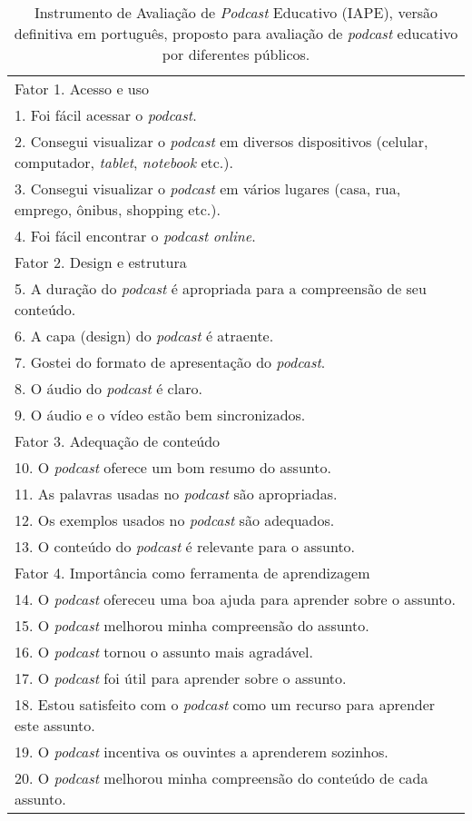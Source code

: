 \begin{table}[htb]
\small
\centering
\caption{Instrumento de Avaliação de \textit{Podcast} Educativo (IAPE), versão definitiva em português, proposto para avaliação de \textit{podcast} educativo por diferentes públicos.}
\label{tab-04}
\begin{threeparttable}
\begin{tabular}{p{}}
\toprule
Fator 1. Acesso e uso \\
1. Foi fácil acessar o \textit{podcast}.\\
2. Consegui visualizar o \textit{podcast} em diversos dispositivos (celular, computador, \textit{tablet}, \textit{notebook} etc.). \\
3. Consegui visualizar o \textit{podcast} em vários lugares (casa, rua, emprego, ônibus, shopping etc.).\\
4. Foi fácil encontrar o \textit{podcast} \textit{online}. \\

Fator 2. Design e estrutura\\
5. A duração do \textit{podcast} é apropriada para a compreensão de seu conteúdo. \\
6. A capa (design) do \textit{podcast} é atraente. \\
7. Gostei do formato de apresentação do \textit{podcast}.\\
8. O áudio do \textit{podcast} é claro. \\
9. O áudio e o vídeo estão bem sincronizados. \\

Fator 3. Adequação de conteúdo\\
10. O \textit{podcast} oferece um bom resumo do assunto.\\
11. As palavras usadas no \textit{podcast} são apropriadas.\\
12. Os exemplos usados no \textit{podcast} são adequados. \\
13. O conteúdo do \textit{podcast} é relevante para o assunto. \\

Fator 4. Importância como ferramenta de aprendizagem\\
14. O \textit{podcast} ofereceu uma boa ajuda para aprender sobre o assunto. \\
15. O \textit{podcast} melhorou minha compreensão do assunto. \\
16. O \textit{podcast} tornou o assunto mais agradável. \\
17. O \textit{podcast} foi útil para aprender sobre o assunto. \\
18. Estou satisfeito com o \textit{podcast} como um recurso para aprender este assunto. \\
19. O \textit{podcast} incentiva os ouvintes a aprenderem sozinhos. \\
20. O \textit{podcast} melhorou minha compreensão do conteúdo de cada assunto.\\
\bottomrule
\end{tabular}
\end{threeparttable}
\end{table}

